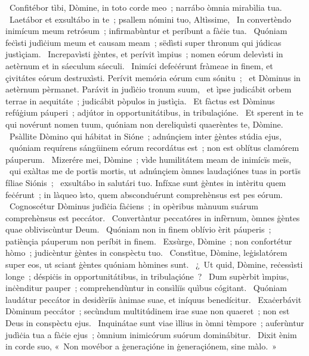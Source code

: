 ~Confitébor tìbi, Dòmine, in toto corde meo~; narrábo òmnia mirabìlia tua. 
~Laetábor et exsultábo in te~; psallem nómini tuo, Altìssime, 
~In convertèndo inimícum meum retrósum~; infirmabùntur et períbunt a fàċie tua. 
~Quóniam feċìsti judìċium meum et causam meam~; sëdìsti super thronum qui júdicas justìçiam. 
~Increpavìsti ġèntes, et perívit ìmpius~; nomen eórum delevìsti in aetèrnum et in sáeculum sáeculi. 
~Inimíci defeċérunt fràmeae in finem, et çivitátes eórum destruxìsti. Perívit memória eórum cum sónitu~; 
~et Dòminus in aetèrnum pèrmanet. Parávit in judìċio tronum suum, 
~et ìpse judicábit orbem terrae in aequitáte~; judicábit pòpulos in justìçia. 
~Et fàctus est Dòminus refúġium páuperi~; adjútor in opportunitátibus, in tribulaçióne. 
~Et sperent in te qui novérunt nomen tuum, quóniam non dereliquìsti quaerèntes te, Dòmine. 
~Psàllite Dòmino qui hábitat in Sióne~; adnúnçiem inter ġèntes stúdia ejus, 
~quóniam requírens sángüinem eórum recordátus est~; non est oblítus clamórem páuperum. 
~Mizerére mei, Dòmine~; vìde humilitátem meam de inimícïs meïs, 
~qui exàltas me de portïs mortis, ut adnúnçiem òmnes laudaçiónes tuas in portïs fíliae Siónis~; 
~exsultábo in salutári tuo. Infíxae sunt ġèntes in intèritu quem feċérunt~; in làqueo ìsto, quem absconduérunt comprehènsus est pes eórum. 
~Cognoscétur Dòminus judìċia fàċiens~; in opèribus mànuum suárum comprehènsus est peccátor. 
~Convertàntur peccatóres in infèrnum, òmnes ġèntes quae obliviscùntur Deum. 
~Quóniam non in finem oblívio èrit páuperis~; patiènçia páuperum non períbit in finem. 
~Exsùrge, Dòmine~; non confortétur hòmo~; judicèntur ġèntes in conspèctu tuo. 
~Constìtue, Dòmine, leġislatórem super eos, ut sciant ġèntes quóniam hòmines sunt. 
~¿~Ut quid, Dòmine, reċessìsti longe~; déspiċis in opportunitátibus, in tribulaçióne~? 
~Dum supèrbit ìmpius, inċènditur pauper~; comprehendùntur in consìliïs quìbus cógitant. 
~Quóniam laudátur peccátor in desidèriïs ànimae suae, et iníquus benedícitur. 
~Exaċerbávit Dòminum peccátor~; secùndum multitúdinem irae suae non quaeret~; non est Deus in conspèctu ejus. 
~Inquinátae sunt viae ìllius in òmni tèmpore~; auferùntur judìċia tua a fàċie ejus~; òmnium inimicórum suórum dominábitur. 
~Dixit ènim in corde suo, «~Non movébor a ġeneraçióne in ġeneraçiónem, sine màlo.~»
